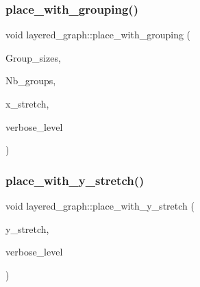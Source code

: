 \mbox{\label{classlayered__graph_a1b4f3b91e957060dc9375b9ce9c8b1a3}} 
\subsubsection{\texorpdfstring{place\+\_\+with\+\_\+grouping()}{place\_with\_grouping()}}
{\footnotesize\ttfamily void layered\+\_\+graph\+::place\+\_\+with\+\_\+grouping (\begin{DoxyParamCaption}\item[{\mbox{\hyperlink{galois_8h_a09fddde158a3a20bd2dcadb609de11dc}{I\+NT}} $\ast$$\ast$}]{Group\+\_\+sizes,  }\item[{\mbox{\hyperlink{galois_8h_a09fddde158a3a20bd2dcadb609de11dc}{I\+NT}} $\ast$}]{Nb\+\_\+groups,  }\item[{double}]{x\+\_\+stretch,  }\item[{\mbox{\hyperlink{galois_8h_a09fddde158a3a20bd2dcadb609de11dc}{I\+NT}}}]{verbose\+\_\+level }\end{DoxyParamCaption})}

\mbox{\label{classlayered__graph_a91be2d3f0093247a7fa3bf3aedf1fdfb}} 
\subsubsection{\texorpdfstring{place\+\_\+with\+\_\+y\+\_\+stretch()}{place\_with\_y\_stretch()}}
{\footnotesize\ttfamily void layered\+\_\+graph\+::place\+\_\+with\+\_\+y\+\_\+stretch (\begin{DoxyParamCaption}\item[{double}]{y\+\_\+stretch,  }\item[{\mbox{\hyperlink{galois_8h_a09fddde158a3a20bd2dcadb609de11dc}{I\+NT}}}]{verbose\+\_\+level }\end{DoxyParamCaption})}

\mbox{\label{classlayered__graph_af2283d8753e33e6567f707009537a8aa}} 
